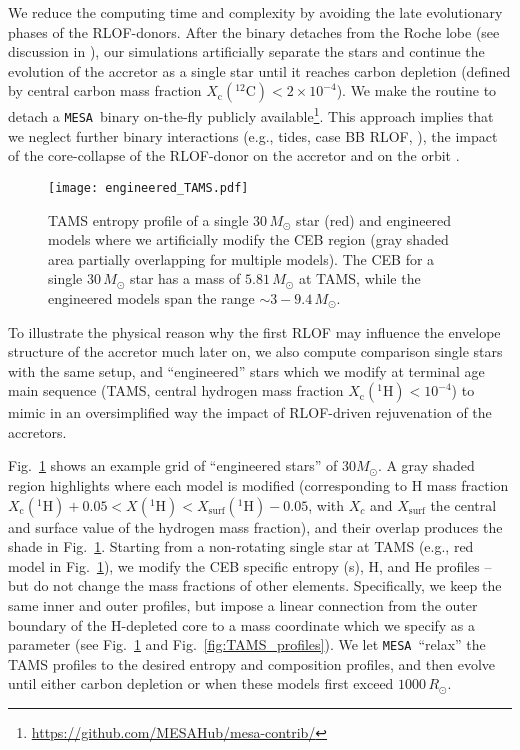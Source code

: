 \documentclass[twocolumn,twocolappendix,trackchanges]{aastex63}
\newcommand{\code}[1]{\texttt{#1}}
\newcommand{\mesa}{\code{MESA}}
\DeclareRobustCommand{\Figref}[1]{Fig.~\ref{#1}}
\begin{document}
We reduce the computing time and complexity by avoiding the late
evolutionary phases of the RLOF-donors. After the binary detaches from
the Roche lobe (see discussion in \citealt{renzo:2021zoph}), our
simulations artificially separate the stars and continue the evolution
of the accretor as a single star until it reaches carbon depletion
(defined by central carbon mass fraction
$X_\mathrm{c}(^{12}\mathrm{C})<2\times10^{-4} $). We make the routine
to detach a \mesa\ binary on-the-fly publicly
available\footnote{\url{https://github.com/MESAHub/mesa-contrib/}}.
This approach implies that we neglect further binary interactions
(e.g., tides, case BB RLOF, \citealt{laplace:2020}), the impact of the
core-collapse of the RLOF-donor on the accretor
\cite[e.g.,][]{hirai:2018, ogata:2021} and on the orbit
\citep[e.g.,][]{brandt:1995, kalogera:1996, tauris:1998,
  renzo:2019walk}.


\begin{figure}[btp]
  \texttt{[image: engineered\_TAMS.pdf]}
  \caption{TAMS entropy profile of a single 30\,$M_\odot$ star (red)
    and engineered models where we artificially modify the CEB region
    (gray shaded area partially overlapping for multiple models). The CEB for a
    single $30\,M_\odot$ star has a mass of $5.81\,M_\odot$ at TAMS,
    while the engineered models span the range $\sim3-9.4\,M_\odot$.}
  \label{fig:engineered_TAMS}
\end{figure}

To illustrate the physical reason why the first RLOF may influence the
envelope structure of the accretor much later on, we also compute
comparison single stars with the same setup, and ``engineered'' stars
which we modify at terminal age main sequence (TAMS, central hydrogen
mass fraction $X_\mathrm{c}(^1\mathrm{H})<10^{-4}$) to mimic in an
oversimplified way the impact of RLOF-driven rejuvenation of the
accretors.

\Figref{fig:engineered_TAMS} shows an example grid of ``engineered
stars'' of $30M_\odot$. A gray shaded region highlights where each
model is modified (corresponding to H mass fraction
$X_\mathrm{c}(^1\mathrm{H})+0.05<X(^1\mathrm{H})<X_\mathrm{surf}(^1\mathrm{H})-0.05$,
with $X_c$ and $X_\mathrm{surf}$ the central and surface value of the
hydrogen mass fraction), and their overlap produces the shade in
\Figref{fig:engineered_TAMS}. Starting from a non-rotating single star
at TAMS (e.g., red model in \Figref{fig:engineered_TAMS}), we modify
the CEB specific entropy (s), H, and He profiles -- but do not change
the mass fractions of other elements. Specifically, we keep the same
inner and outer profiles, but impose a linear connection from the
outer boundary of the H-depleted core to a mass coordinate which we
specify as a parameter (see \Figref{fig:engineered_TAMS} and
\Figref{fig:TAMS_profiles}). We let \mesa\ ``relax'' the TAMS profiles
to the desired entropy and composition profiles, and then evolve until
either carbon depletion or when these models first exceed
$1000\,R_\odot$.
\end{document}
